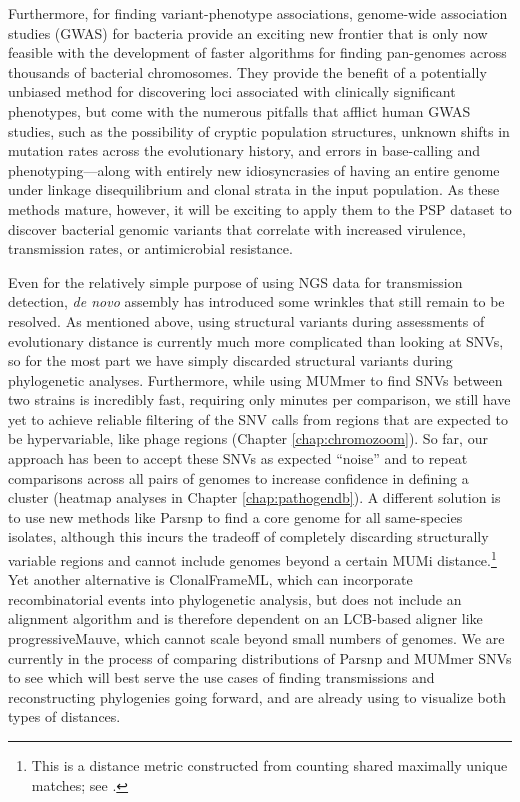 Furthermore, for finding variant-phenotype associations, genome-wide association studies (GWAS) for bacteria provide an exciting new frontier that is only now feasible with the development of faster algorithms for finding pan-genomes across thousands of bacterial chromosomes.\autocite{Brynildsrud2016} They provide the benefit of a potentially unbiased method for discovering loci associated with clinically significant phenotypes, but come with the numerous pitfalls that afflict human GWAS studies, such as the possibility of cryptic population structures, unknown shifts in mutation rates across the evolutionary history, and errors in base-calling and phenotyping—along with entirely new idiosyncrasies of having an entire genome under linkage disequilibrium and clonal strata in the input population.\autocite{Read2014,Brynildsrud2016} As these methods mature, however, it will be exciting to apply them to the PSP dataset to discover bacterial genomic variants that correlate with increased virulence, transmission rates, or antimicrobial resistance.

Even for the relatively simple purpose of using NGS data for transmission detection, \emph{de novo} assembly has introduced some wrinkles that still remain to be resolved. As mentioned above, using structural variants during assessments of evolutionary distance is currently much more complicated than looking at SNVs, so for the most part we have simply discarded structural variants during phylogenetic analyses. Furthermore, while using MUMmer\autocite{Delcher2003} to find SNVs between two strains is incredibly fast, requiring only minutes per comparison, we still have yet to achieve reliable filtering of the SNV calls from regions that are expected to be hypervariable, like phage regions (Chapter \ref{chap:chromozoom}). So far, our approach has been to accept these SNVs as expected ``noise'' and to repeat comparisons across all pairs of genomes to increase confidence in defining a cluster (heatmap analyses in Chapter \ref{chap:pathogendb}). A different solution is to use new methods like Parsnp to find a core genome for all same-species isolates, although this incurs the tradeoff of completely discarding structurally variable regions and cannot include genomes beyond a certain MUMi distance.\footnote{This is a distance metric constructed from counting shared maximally unique matches; see \textcite{Deloger2009}.} Yet another alternative is ClonalFrameML,\autocite{Didelot2015} which can incorporate recombinatorial events into phylogenetic analysis, but does not include an alignment algorithm and is therefore dependent on an LCB-based aligner like progressiveMauve,\autocite{Darling2010} which cannot scale beyond small numbers of genomes. We are currently in the process of comparing distributions of Parsnp and MUMmer SNVs to see which will best serve the use cases of finding transmissions and reconstructing phylogenies going forward, and are already using \pathogendbviz{} to visualize both types of distances.


